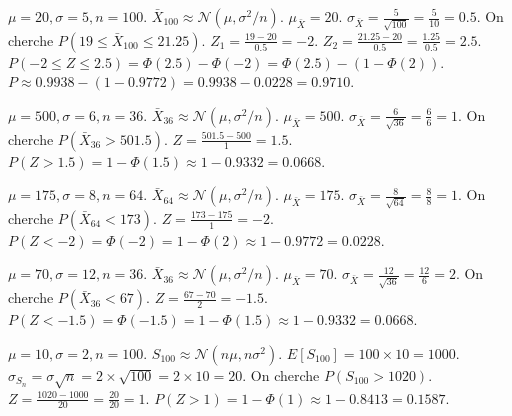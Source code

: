\begin{correctionbox}
$\mu=20, \sigma=5, n=100$. $\bar{X}_{100} \approx \mathcal{N}(\mu, \sigma^2/n)$.
$\mu_{\bar{X}} = 20$. $\sigma_{\bar{X}} = \frac{5}{\sqrt{100}} = \frac{5}{10} = 0.5$.
On cherche $P(19 \le \bar{X}_{100} \le 21.25)$.
$Z_1 = \frac{19 - 20}{0.5} = -2$.
$Z_2 = \frac{21.25 - 20}{0.5} = \frac{1.25}{0.5} = 2.5$.
$P(-2 \le Z \le 2.5) = \Phi(2.5) - \Phi(-2) = \Phi(2.5) - (1 - \Phi(2))$.
$P \approx 0.9938 - (1 - 0.9772) = 0.9938 - 0.0228 = 0.9710$.
\end{correctionbox}

\begin{correctionbox}
$\mu=500, \sigma=6, n=36$. $\bar{X}_{36} \approx \mathcal{N}(\mu, \sigma^2/n)$.
$\mu_{\bar{X}} = 500$. $\sigma_{\bar{X}} = \frac{6}{\sqrt{36}} = \frac{6}{6} = 1$.
On cherche $P(\bar{X}_{36} > 501.5)$.
$Z = \frac{501.5 - 500}{1} = 1.5$.
$P(Z > 1.5) = 1 - \Phi(1.5) \approx 1 - 0.9332 = 0.0668$.
\end{correctionbox}

\begin{correctionbox}
$\mu=175, \sigma=8, n=64$. $\bar{X}_{64} \approx \mathcal{N}(\mu, \sigma^2/n)$.
$\mu_{\bar{X}} = 175$. $\sigma_{\bar{X}} = \frac{8}{\sqrt{64}} = \frac{8}{8} = 1$.
On cherche $P(\bar{X}_{64} < 173)$.
$Z = \frac{173 - 175}{1} = -2$.
$P(Z < -2) = \Phi(-2) = 1 - \Phi(2) \approx 1 - 0.9772 = 0.0228$.
\end{correctionbox}

\begin{correctionbox}
$\mu=70, \sigma=12, n=36$. $\bar{X}_{36} \approx \mathcal{N}(\mu, \sigma^2/n)$.
$\mu_{\bar{X}} = 70$. $\sigma_{\bar{X}} = \frac{12}{\sqrt{36}} = \frac{12}{6} = 2$.
On cherche $P(\bar{X}_{36} < 67)$.
$Z = \frac{67 - 70}{2} = -1.5$.
$P(Z < -1.5) = \Phi(-1.5) = 1 - \Phi(1.5) \approx 1 - 0.9332 = 0.0668$.
\end{correctionbox}

\begin{correctionbox}
$\mu=10, \sigma=2, n=100$. $S_{100} \approx \mathcal{N}(n\mu, n\sigma^2)$.
$E[S_{100}] = 100 \times 10 = 1000$.
$\sigma_{S_n} = \sigma\sqrt{n} = 2 \times \sqrt{100} = 2 \times 10 = 20$.
On cherche $P(S_{100} > 1020)$.
$Z = \frac{1020 - 1000}{20} = \frac{20}{20} = 1$.
$P(Z > 1) = 1 - \Phi(1) \approx 1 - 0.8413 = 0.1587$.
\end{correctionbox}

